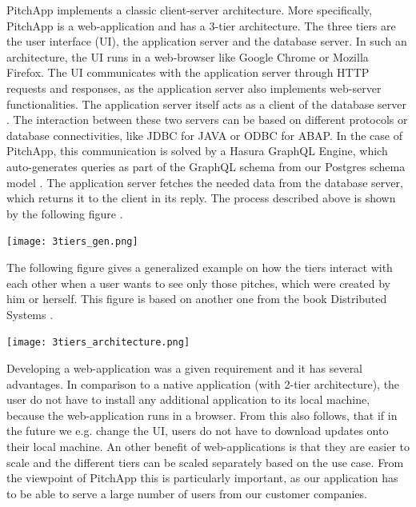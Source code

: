 PitchApp implements a classic client-server architecture. More specifically, PitchApp is a web-application and has a 3-tier architecture. The three tiers are the user interface (UI), the application server and the database server. In such an architecture, the UI runs in a web-browser like Google Chrome or Mozilla Firefox. The UI communicates with the application server through HTTP requests and responses, as the application server also implements web-server functionalities. The application server itself acts as a client of the database server \parencite[p.~80]{MT17}. The interaction between these two servers can be based on different protocols or database connectivities, like JDBC for JAVA or ODBC for ABAP. In the case of PitchApp, this communication is solved by a Hasura GraphQL Engine, which auto-generates queries as part of the GraphQL schema from our Postgres schema model \parencite{Hasura}. The application server fetches the needed data from the database server, which returns it to the client in its reply. The process described above is shown by the following figure \parencite[p.~80]{MT17}.

\begin{center}
\texttt{[image: 3tiers\_gen.png]}
\end{center}

\break

The following figure gives a generalized example on how the tiers interact with each other when a user wants to see only those pitches, which were created by him or herself. This figure is based on another one from the book Distributed Systems \parencite[p.~61]{MT17}.

\begin{center}
	\texttt{[image: 3tiers\_architecture.png]}
\end{center}

Developing a web-application was a given requirement and it has several advantages. In comparison to a native application (with 2-tier architecture), the user do not have to install any additional application to its local machine, because the web-application runs in a browser. From this also follows, that if in the future we e.g. change the UI, users do not have to download updates onto their local machine. An other benefit of web-applications is that they are easier to scale and the different tiers can be scaled separately based on the use case. From the viewpoint of PitchApp this is particularly important, as our application has to be able to serve a large number of users from our customer companies.

